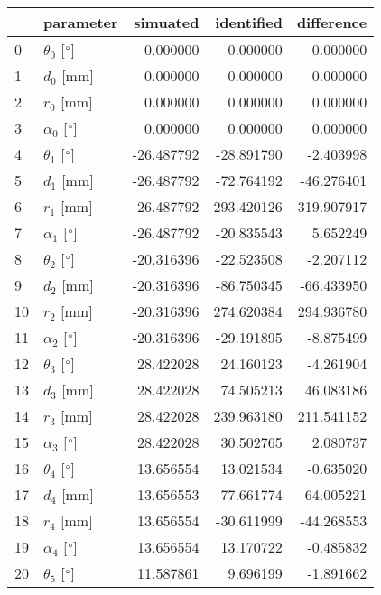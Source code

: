 \documentclass{standalone}%
\begin{document}
%
\normalsize%
\begin{tabular}{llrrr}
\toprule
{} &                 parameter &   simuated &  identified &  difference \\
\midrule
0  &  $\theta_{0}$ [$\degree$] &   0.000000 &    0.000000 &    0.000000 \\
1  &              $d_{0}$ [mm] &   0.000000 &    0.000000 &    0.000000 \\
2  &              $r_{0}$ [mm] &   0.000000 &    0.000000 &    0.000000 \\
3  &  $\alpha_{0}$ [$\degree$] &   0.000000 &    0.000000 &    0.000000 \\
4  &  $\theta_{1}$ [$\degree$] & -26.487792 &  -28.891790 &   -2.403998 \\
5  &              $d_{1}$ [mm] & -26.487792 &  -72.764192 &  -46.276401 \\
6  &              $r_{1}$ [mm] & -26.487792 &  293.420126 &  319.907917 \\
7  &  $\alpha_{1}$ [$\degree$] & -26.487792 &  -20.835543 &    5.652249 \\
8  &  $\theta_{2}$ [$\degree$] & -20.316396 &  -22.523508 &   -2.207112 \\
9  &              $d_{2}$ [mm] & -20.316396 &  -86.750345 &  -66.433950 \\
10 &              $r_{2}$ [mm] & -20.316396 &  274.620384 &  294.936780 \\
11 &  $\alpha_{2}$ [$\degree$] & -20.316396 &  -29.191895 &   -8.875499 \\
12 &  $\theta_{3}$ [$\degree$] &  28.422028 &   24.160123 &   -4.261904 \\
13 &              $d_{3}$ [mm] &  28.422028 &   74.505213 &   46.083186 \\
14 &              $r_{3}$ [mm] &  28.422028 &  239.963180 &  211.541152 \\
15 &  $\alpha_{3}$ [$\degree$] &  28.422028 &   30.502765 &    2.080737 \\
16 &  $\theta_{4}$ [$\degree$] &  13.656554 &   13.021534 &   -0.635020 \\
17 &              $d_{4}$ [mm] &  13.656553 &   77.661774 &   64.005221 \\
18 &              $r_{4}$ [mm] &  13.656554 &  -30.611999 &  -44.268553 \\
19 &  $\alpha_{4}$ [$\degree$] &  13.656554 &   13.170722 &   -0.485832 \\
20 &  $\theta_{5}$ [$\degree$] &  11.587861 &    9.696199 &   -1.891662 \\

\end{tabular}
\end{document}
